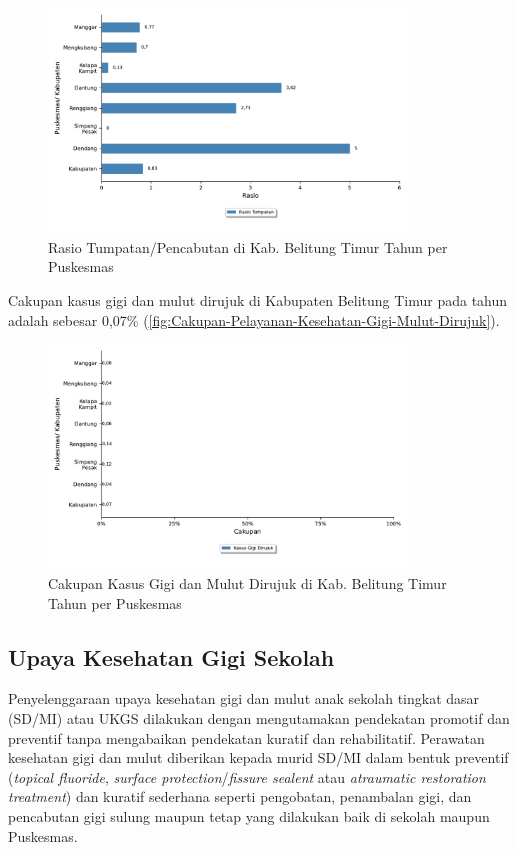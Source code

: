 \begin{figure}[H]
	\centering
	\includegraphics[width=0.85\textwidth]{bab_05/bab_05_27a_gimulTumpatan}
	\caption{Rasio Tumpatan/Pencabutan di Kab. Belitung Timur Tahun \tP per Puskesmas}
	\label{fig:Cakupan-Pelayanan-Kesehatan-Gigi-Mulut-Tumpatan}
\end{figure}

Cakupan kasus gigi dan mulut dirujuk di Kabupaten Belitung Timur pada tahun \tP adalah sebesar 0,07\% (\autoref{fig:Cakupan-Pelayanan-Kesehatan-Gigi-Mulut-Dirujuk}).

\begin{figure}[H]
	\centering
    \includegraphics[width=0.85\textwidth]{bab_05/bab_05_27b_gimulDirujuk}
	\caption{Cakupan Kasus Gigi dan Mulut Dirujuk di Kab. Belitung Timur Tahun \tP per Puskesmas}
	\label{fig:Cakupan-Pelayanan-Kesehatan-Gigi-Mulut-Dirujuk}
\end{figure}

\subsection{Upaya Kesehatan Gigi Sekolah}
Penyelenggaraan upaya kesehatan gigi dan mulut anak sekolah tingkat dasar (SD/MI) atau UKGS dilakukan dengan mengutamakan pendekatan promotif dan preventif tanpa mengabaikan pendekatan kuratif dan rehabilitatif.
Perawatan kesehatan gigi dan mulut diberikan kepada murid SD/MI dalam bentuk preventif (\textit{topical fluoride}, \textit{surface protection}/\textit{fissure sealent} atau \textit{atraumatic restoration treatment}) dan kuratif sederhana seperti pengobatan, penambalan gigi, dan pencabutan gigi sulung maupun tetap yang dilakukan baik di sekolah maupun Puskesmas.

